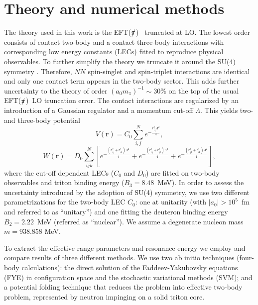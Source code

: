 \documentclass[5p,times]{elsarticle}
\newcommand{\eftnopi}{\mbox{EFT($\slashed{\pi}$) }}
\begin{document}
\section{Theory and numerical methods}

The theory used in this work is the \eftnopi\cite{vanKolck:1999mw} truncated at LO. The lowest order consists of contact two-body and a contact three-body interactions with corresponding low energy constants (LECs) fitted to reproduce physical observables. To further simplify the theory we truncate it around the SU(4) symmetry \cite{Konig:2016utl}. %
Therefore, $NN$ spin-singlet and spin-triplet interactions are identical and only one contact term appears in the two-body sector. This adds further uncertainty to the theory of order $(a_0m_{\pi})^{-1}\sim30\%$ on the top of the usual \eftnopi LO truncation error. The contact interactions are regularized by an introduction of a Gaussian regulator and a momentum cut-off $\Lambda$. This yields two- and three-body potential 
%
\begin{equation}
    V(\textbf{r})=C_0 \sum_{i,j}^N e^{-\frac{r_{ij}^2\Lambda^2}{4}},
\end{equation}
%
\begin{equation}
    W(\textbf{r})=D_0 \sum_{ijk}^N \left[
    e^{-\frac{(r_{ij}^2+r_{ik}^2)\Lambda^2}{4}}+
    e^{-\frac{(r_{ij}^2+r_{jk}^2)\Lambda^2}{4}}+
    e^{-\frac{(r_{jk}^2+r_{ik}^2)\Lambda^2}{4}}\right],
\end{equation}
%
where the cut-off dependent LECs ($C_0$ and $D_0$) are fitted on two-body observables and triton binding energy ($B_3=8.48$~MeV). 
In order to assess the uncertainty introduced by the adoption of SU(4) symmetry, we use two different parametrizations for the two-body LEC $C_0$: one at unitarity (with $|a_0|>10^5$~fm and referred to as ``unitary'') and one fitting the deuteron binding energy $B_2=2.22$~MeV (referred as ``nuclear''). We assume a degenerate nucleon mass $m=938.858$ MeV.

To extract the effective range parameters and resonance energy we employ and compare results of three different methods. We use two ab initio techniques (four-body calculations): the direct solution of the Faddeev-Yakubovsky equations (FYE) in configuration space \cite{Lazauskas:2004hq, Lazauskas:2019hil} and the stochastic variational methods (SVM)\cite{Suzuki:1998bn}; 
and a potential folding technique that reduces the problem into effective two-body problem, represented by neutron impinging on a solid triton core.
\end{document}
